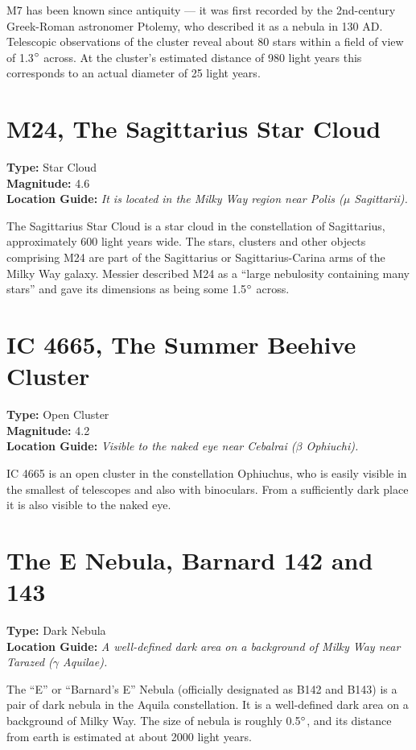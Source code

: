 M7 has been known since antiquity --- it was first recorded by the 2nd-century Greek-Roman astronomer Ptolemy, who described it as a nebula in 130 AD. Telescopic observations of the cluster reveal about 80 stars within a field of view of 1.3$\degree$ across. At the cluster's estimated distance of 980 light years this corresponds to an actual diameter of 25 light years.

\section{M24, The Sagittarius Star Cloud}
\textbf{Type:} Star Cloud \\
\textbf{Magnitude:} 4.6 \\ 
\textbf{Location Guide:} \textit{It is located in the Milky Way region near Polis ($\mu$ Sagittarii).}

The Sagittarius Star Cloud is a star cloud in the constellation of Sagittarius, approximately 600 light years wide. The stars, clusters and other objects comprising M24 are part of the Sagittarius or Sagittarius-Carina arms of the Milky Way galaxy. Messier described M24 as a ``large nebulosity containing many stars'' and gave its dimensions as being some 1.5$\degree$ across.

\section{IC 4665, The Summer Beehive Cluster}
\textbf{Type:} Open Cluster \\
\textbf{Magnitude:} 4.2 \\ 
\textbf{Location Guide:} \textit{Visible to the naked eye near Cebalrai ($\beta$ Ophiuchi).}

IC 4665 is an open cluster in the constellation Ophiuchus, who is easily visible in the smallest of telescopes and also with binoculars. From a sufficiently dark place it is also visible to the naked eye.

\section{The E Nebula, Barnard 142 and 143}
\textbf{Type:} Dark Nebula \\
\textbf{Location Guide:} \textit{A well-defined dark area on a background of Milky Way near Tarazed ($\gamma$ Aquilae).}

The ``E'' or ``Barnard's E'' Nebula (officially designated as B142 and B143) is a pair of dark nebula in the Aquila constellation. It is a well-defined dark area on a background of Milky Way. The size of nebula is roughly 0.5$\degree$, and its distance from earth is estimated at about 2000 light years.

